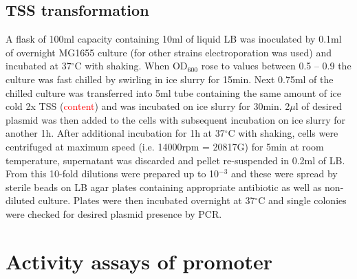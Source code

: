 \subsection{TSS transformation}
A flask of 100ml capacity containing 10ml of liquid LB was inoculated by 0.1ml of overnight MG1655 culture (for other strains electroporation was used) and incubated at 37$^{\circ}$C with shaking.
When OD$_{600}$ rose to values between 0.5 -- 0.9 the culture was fast chilled by swirling in ice slurry for 15min.
Next 0.75ml of the chilled culture was transferred into 5ml tube containing the same amount of ice cold 2x TSS (\textcolor{red}{content}) and was incubated on ice slurry for 30min.
2$\mu$l of desired plasmid was then added to the cells with subsequent incubation on ice slurry for another 1h.
After additional incubation for 1h at 37$^{\circ}$C with shaking, cells were centrifuged at maximum speed (i.e. 14000rpm = 20817G) for 5min at room temperature, supernatant was discarded and pellet re-suspended in 0.2ml of LB.
From this 10-fold dilutions were prepared up to 10$^{-3}$ and these were spread by sterile beads on LB agar plates containing appropriate antibiotic as well as non-diluted culture.
Plates were then incubated overnight at 37$^{\circ}$C and single colonies were checked for desired plasmid presence by PCR.

\section{Activity assays of  promoter}


\shorthandon{-} 
